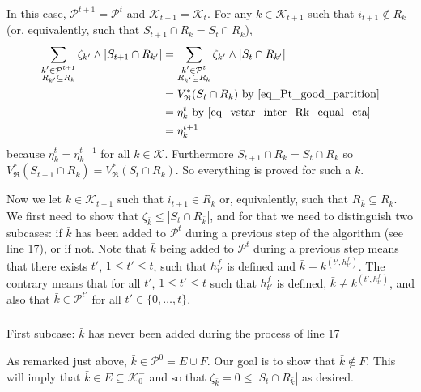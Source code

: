 \documentclass[
  11pt,
  a4paper,
]{article}
\makeatletter
\let\oldsubparagraph\subparagraph
\renewcommand{\subparagraph}{
    \@ifstar
      \xxxSubParagraphStar
      \xxxSubParagraphNoStar
  }
\newcommand{\xxxSubParagraphStar}[1]{\oldsubparagraph*{#1}\mbox{}}
\newcommand{\xxxSubParagraphNoStar}[1]{\oldsubparagraph{#1}\mbox{}}
\theoremstyle{plain}
\theoremstyle{plain}
\theoremstyle{definition}
\theoremstyle{plain}
\theoremstyle{definition}
\theoremstyle{remark}
\makeatother
\begin{document}
In this case, \(\mathcal{P}^{t+1}=\mathcal{P}^t\) and
\(\mathcal{K}_{t+1}=\mathcal{K}_t\). For any \(k\in\mathcal{K}_{t+1}\)
such that \(i_{t+1}\not\in R_k\) (or, equivalently, such that
\(S_{t+1}\cap R_k=S_t\cap R_k\)), \begin{align*}
\sum_{\substack{k'\in\mathcal{P}^{t+1} \\ R_{k'}\subseteq R_k}} \zeta_{k'}\wedge |S_{t+1}\cap R_{k'}|&=\sum_{\substack{k'\in\mathcal{P}^{t} \\ R_{k'}\subseteq R_k}} \zeta_{k'}\wedge |S_{t}\cap R_{k'}| \\
&=V^*_{\mathfrak{R}}(S_t\cap R_k) \text{ by~\eqref{eq_Pt_good_partition}}\\
&=\eta_k^t \text{ by~\eqref{eq_vstar_inter_Rk_equal_eta}}\\
&=\eta_k^{t+1}
\end{align*} because \(\eta_k^t=\eta_k^{t+1}\) for all
\(k\in\mathcal{K}\). Furthermore \(S_{t+1}\cap R_k=S_t\cap R_k\) so
\(V^*_{\mathfrak{R}}(S_{t+1}\cap R_k)=V^*_{\mathfrak{R}}(S_t\cap R_k)\).
So everything is proved for such a \(k\).

Now we let \(k\in\mathcal{K}_{t+1}\) such that \(i_{t+1}\in R_k\) or,
equivalently, such that \(R_{\bar k}\subseteq R_k\). We first need to
show that \(\zeta_{\bar k}\leq |S_t\cap R_{\bar k}|\), and for that we
need to distinguish two subcases: if \(\bar k\) has been added to
\(\mathcal{P}^t\) during a previous step of the algorithm (see line 17),
or if not. Note that \(\bar k\) being added to \(\mathcal{P}^t\) during
a previous step means that there exists \(t'\), \(1\leq t'\leq t\), such
that \(h^f_{t'}\) is defined and \(\bar k= k^{(t',h^f_{t'})}\). The
contrary means that for all \(t'\), \(1\leq t'\leq t\) such that
\(h^f_{t'}\) is defined, \(\bar k\neq k^{(t',h^f_{t'})}\), and also that
\(\bar k\in\mathcal{P}^{t'}\) for all \(t'\in\{0,\dotsc,t\}\).

\subparagraph{\texorpdfstring{First subcase: \(\bar k\) has never been
added during the process of line
17}{First subcase: \textbackslash bar k has never been added during the process of line 17}}\label{first-subcase-bar-k-has-never-been-added-during-the-process-of-line-17}

As remarked just above, \(\bar k\in\mathcal{P}^{0}=E\cup F\). Our goal
is to show that \(\bar k\not\in F\). This will imply that
\(\bar k\in E\subseteq \mathcal{K}_0^-\) and so that
\(\zeta_{\bar k}=0\leq| S_{t}\cap R_{\bar k} |\) as desired.
\end{document}
